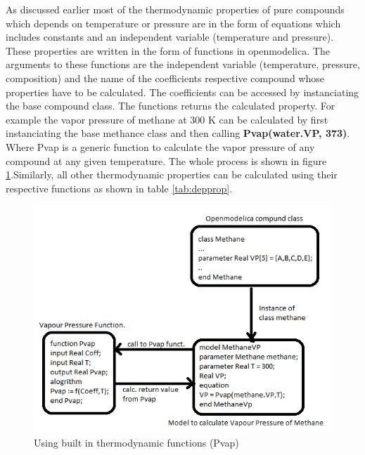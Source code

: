 \documentclass[12pt]{report}
\begin{document}
As discussed earlier most of the thermodynamic properties of pure compounds which depends on temperature or pressure are in the form of equations which includes constants and an independent variable (temperature and pressure). These properties are written in the form of functions in openmodelica. The arguments to these functions are the independent variable (temperature, pressure, composition) and the name of the coefficients respective compound whose properties have to be calculated. The coefficients can be accessed by instanciating the base compound class. The functions returns the calculated property. For example the vapor pressure of methane at 300 K can be calculated by first instanciating the base methance class and then calling \textbf{Pvap(water.VP, 373)}. Where Pvap is a generic function to calculate the vapor pressure of any compound at any given temperature. The whole process is shown in figure \ref{fig:BT2}.Similarly, all other thermodynamic properties can be calculated using their respective functions as shown in table \ref{tab:depprop}.

\begin{figure}
\centering
\includegraphics[width=0.8\linewidth]{BT2}
\caption{Using built in thermodynamic functions (Pvap)}
\label{fig:BT2}
\end{figure}
\end{document}
